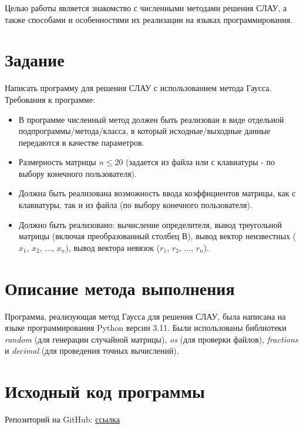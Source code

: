 \documentclass[14pt]{article}
\begin{document}
Целью работы является знакомство с численными методами решения СЛАУ, а также способами и особенностями их реализации на языках программирования.

\section{Задание}

Написать программу для решения СЛАУ с использованием метода Гаусса. Требования к программе:
\begin{itemize}
    \item В программе численный метод должен быть реализован в виде отдельной подпрограммы/метода/класса, в который исходные/выходные данные передаются в качестве параметров.
    \item Размерность матрицы $n\leq20$ (задается из файла или с клавиатуры - по выбору конечного пользователя).
    \item Должна быть реализована возможность ввода коэффициентов матрицы, как с клавиатуры, так и из файла (по выбору конечного пользователя).
    \item Должно быть реализовано: вычисление определителя, вывод треугольной матрицы (включая преобразованный столбец В), вывод вектор неизвестных ($x_1$, $x_2$, ..., $x_n$), вывод вектора невязок ($r_1$, $r_2$, ..., $r_n$).
\end{itemize}

\section{Описание метода выполнения}
Программа, реализующая метод Гаусса для решения СЛАУ, была написана на языке программирования Python версии 3.11. Были использованы библиотеки \textit{random} (для генерации случайной матрицы), \textit{os} (для проверки файлов),  \textit{fractions} и \textit{decimal} (для проведения точных вычислений).

\newpage

\section{Исходный код программы}

Репозиторий на GitHub: \href{https://github.com/byrybdyk/Computational-math/tree/main/lb1}{\underline{ссылка}}
\end{document}
